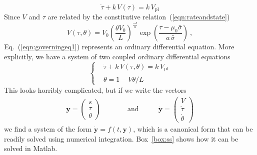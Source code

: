 \documentclass[letterpaper,12pt,]{memoir}
\begin{document}
\begin{equation}\label{eqn:governingeq1}
\dot{\tau}+k\,V(\tau)=k\,V_\text{pl}
\end{equation}
Since $V$ and $\tau$ are related by the constitutive relation~(\ref{eqn:rateandstate})
\begin{equation}
V(\tau,\theta)=V_0\left(\frac{\theta V_0}{L}\right)^\frac{-b}{a}\exp\left(\frac{\tau-\mu_0\bar{\sigma}}{a\,\bar{\sigma}}\right)~,
\end{equation}
Eq.~(\ref{eqn:governingeq1}) represents an ordinary differential equation. More explicitly, we have a system of two coupled ordinary differential equations
\begin{equation}\label{eqn:governingeq2}
\left\{\begin{aligned}
&\dot{\tau}+k\,V(\tau,\theta)=k\,V_\text{pl}\\
&\dot{\theta}=1-V\theta/L
\end{aligned}\right.
\end{equation}
This looks horribly complicated, but if we write the vectors
\begin{equation*}
\begin{aligned}
\textbf{y}=\left(\begin{matrix}
s\\
\tau\\
\theta
\end{matrix}\right) & \qquad \quad\text{and} \qquad &
\dot{\textbf{y}}=\left(\begin{matrix}
V\\
\dot{\tau}\\
\dot{\theta}
\end{matrix}\right)
\end{aligned}
\end{equation*}
we find a system of the form $\dot{\textbf{y}}=f(t,\textbf{y})$, which is a canonical form that can be readily solved using numerical integration. Box~\ref{box:ss} shows how it can be solved in Matlab. 
\end{document}

